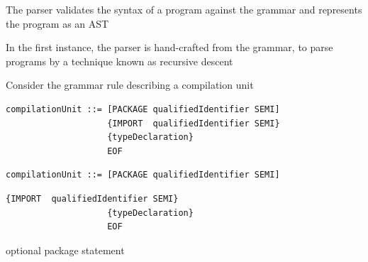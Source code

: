 \documentclass[8pt,a4paper,compress]{beamer}
\begin{document}
\begin{frame}[fragile]


The parser validates the syntax of a \jmm program against the \jmm grammar and represents the program as an AST

\bigskip

In the first instance, the parser is hand-crafted from the grammar, to parse programs by a technique known as recursive descent

\bigskip

Consider the grammar rule describing a compilation unit

\smallskip

\begin{overprint}
\begin{tcolorbox}[enhanced,drop shadow southwest,sharp corners,size=fbox,colback=white,fontlower=\small\ttfamily,collower=silver900]

\begin{lstlisting}[language={},style=focusin]
compilationUnit ::= [PACKAGE qualifiedIdentifier SEMI]
                    {IMPORT  qualifiedIdentifier SEMI}
                    {typeDeclaration} 
                    EOF
\end{lstlisting}

\tcblower
\begin{minipage}[t][.2cm][t]{\textwidth}

\end{minipage}
\end{tcolorbox}

\begin{tcolorbox}[enhanced,drop shadow southwest,sharp corners,size=fbox,colback=white,fontlower=\small\ttfamily,collower=silver900]

\begin{lstlisting}[language={},style=focusin,backgroundcolor=\color{lime100}]
compilationUnit ::= [PACKAGE qualifiedIdentifier SEMI]
\end{lstlisting}
\begin{lstlisting}[language={},style=focusout]
                    {IMPORT  qualifiedIdentifier SEMI}
                    {typeDeclaration} 
                    EOF
\end{lstlisting}

\tcblower
\begin{minipage}[t][.2cm][t]{\textwidth}
optional package statement
\end{minipage}
\end{tcolorbox}


\end{overprint}
\end{frame}
\end{document}
